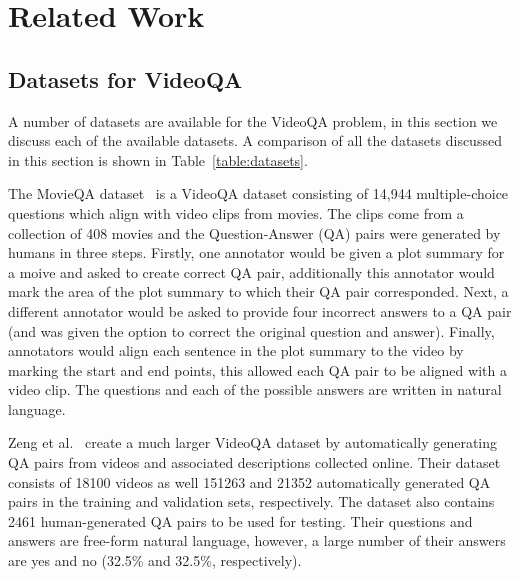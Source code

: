 \documentclass[../interim.tex]{subfiles}
\begin{document}
\section{Related Work} \label{section:related}

\subsection{Datasets for VideoQA}

A number of datasets are available for the VideoQA problem, in this section we discuss each of the available datasets. A comparison of all the datasets discussed in this section is shown in Table~\ref{table:datasets}.

The MovieQA dataset~\cite{dataset:movie-qa} is a VideoQA dataset consisting of 14,944 multiple-choice questions which align with video clips from movies. The clips come from a collection of 408 movies and the Question-Answer (QA) pairs were generated by humans in three steps. Firstly, one annotator would be given a plot summary for a moive and asked to create correct QA pair, additionally this annotator would mark the area of the plot summary to which their QA pair corresponded. Next, a different annotator would be asked to provide four incorrect answers to a QA pair (and was given the option to correct the original question and answer). Finally, annotators would align each sentence in the plot summary to the video by marking the start and end points, this allowed each QA pair to be aligned with a video clip. The questions and each of the possible answers are written in natural language.

Zeng et al.~\cite{dataset:zeng} create a much larger VideoQA dataset by automatically generating QA pairs from videos and associated descriptions collected online. Their dataset consists of 18100 videos as well 151263 and 21352 automatically generated QA pairs in the training and validation sets, respectively. The dataset also contains 2461 human-generated QA pairs to be used for testing. Their questions and answers are free-form natural language, however, a large number of their answers are yes and no (32.5\% and 32.5\%, respectively).
\end{document}
